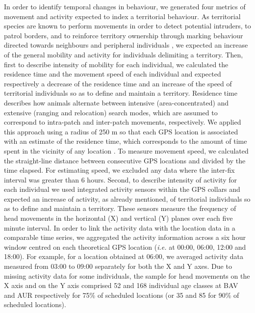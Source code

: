 \documentclass[a4paper,11pt]{article}
\begin{document}
In order to identify temporal changes in behaviour, we generated four
metrics of movement and activity expected to index a territorial
behaviour. As territorial species are known to perform movements in
order to detect potential intruders, to patrol borders, and to
reinforce territory ownership through marking behaviour directed
towards neighbours and peripheral individuals \citep{owen-smith_territoriality_1977}, we
expected an increase of the general mobility and activity for
individuals delimiting a territory. Then, first to describe intensity
of mobility for each individual, we calculated the residence time
\citep{barraquand_animal_2008} and the movement speed of each
individual and expected respectively a decrease of the residence time
and an increase of the speed of territorial individuals so as to
define and maintain a territory. Residence time describes how animals
alternate between intensive (area-concentrated) and extensive (ranging
and relocation) search modes, which are assumed to correspond to
intra-patch and inter-patch movements, respectively. We applied this
approach using a radius of 250 m so that each GPS location is
associated with an estimate of the residence time, which corresponds
to the amount of time spent in the vicinity of any location
\citep{barraquand_animal_2008}. To measure movement speed, we
calculated the straight-line distance between consecutive GPS
locations and divided by the time elapsed. For estimating speed, we
excluded any data where the inter-fix interval was greater than 6
hours. Second, to describe intensity of activity for each individual
we used integrated activity sensors within the GPS collars and
expected an increase of activity, as already mentioned, of territorial
individuals so as to define and maintain a territory. These sensors
measure the frequency of head movements in the horizontal (X) and
vertical (Y) planes over each five minute interval. In order to link
the activity data with the location data in a comparable time series,
we aggregated the activity information across a six hour window
centred on each theoretical GPS location (\textit{i.e.} at 00:00,
06:00, 12:00 and 18:00). For example, for a location obtained at
06:00, we averaged activity data measured from 03:00 to 09:00
separately for both the X and Y axes. Due to missing activity data for
some individuals, the sample for head movements on the X axis and on
the Y axis comprised 52 and 168 individual age classes at BAV and AUR
respectively for 75\% of scheduled locations (or 35 and 85 for 90\% of
scheduled locations).
\end{document}
